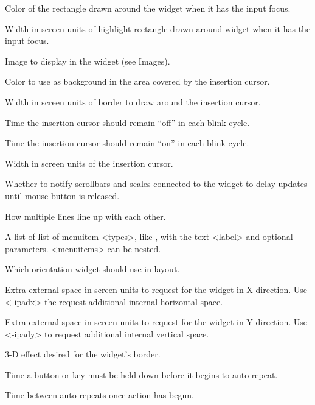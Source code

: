 \begin{enum}{1cm}
Color of the rectangle drawn around the widget when it has the
input focus.

Width in screen units of highlight rectangle drawn around widget 
when it has the input focus.

Image to display in the widget (see Images).

Color to use as background in the area covered by the insertion
cursor.

Width in screen units of border to draw around the insertion cursor.

Time the insertion cursor should remain ``off'' in each blink cycle.

Time the insertion cursor should remain ``on'' in each blink cycle.

Width in screen units of the insertion cursor.

Whether to notify scrollbars and scales connected
to the widget to delay updates until mouse button is released.

How multiple lines line up with each other.

A list of list of menuitem <types>, like , with the text
<label> and optional parameters.  <menuitems> can be nested.

Which orientation widget should use in layout.

Extra external space in screen units to request for the widget in X-direction.
Use <-ipadx> the request additional internal horizontal space.

Extra external space in screen units to request for the widget in Y-direction.
Use <-ipady> to request additional internal vertical space.

3-D  effect desired for the widget's border.

Time a button or key must be held down before it begins to
auto-repeat.

Time between auto-repeats once action has begun.


\end{enum}
